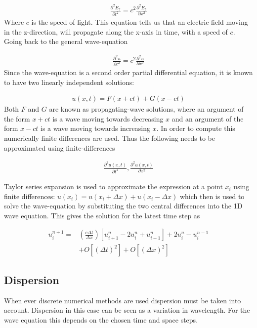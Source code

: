 \begin{align}
  \frac{\partial^2 E_z}{\partial t^2} = c^2 \frac{\partial^2 E_z}{\partial x^2}
\end{align}
Where $c$ is the speed of light. This equation tells us that an electric field moving in the z-direction, will propagate along the x-axis in time, with a speed of $c$. Going back to the general wave-equation\cite{taflove2000computional}

\begin{align}
  \frac{\partial^2 u}{\partial t^2} = c^2 \frac{\partial^2 u}{\partial x^2}
\end{align}
Since the wave-equation is a second order partial differential equation, it is known to have two linearly independent solutions\cite{taflove2000computional}: 

\begin{align}
  u(x,t) = F(x+ct) + G(x-ct)
\end{align}
Both $F$ and $G$ are known as propagating-wave solutions, where an argument of the form $x+ct$ is a wave moving towards decreasing $x$ and an argument of the form $x-ct$ is a wave moving towards increasing $x$\cite{taflove2000computional}. In order to compute this numerically finite differences are used. Thus the following needs to be approximated using finite-differences 

\begin{align}
  \frac{\partial^2 u(x,t)}{\partial t^2},\frac{\partial^2 u(x,t)}{\partial x^2}
\end{align}

Taylor series expansion is used to approximate the expression at a point $x_i$ using finite differences: $u(x_i) = u(x_i+\Delta x) + u(x_i - \Delta x)$ which then is used to solve the wave-equation by substituting the two central differences into the 1D wave equation. This gives the solution for the latest time step as\cite{taflove2000computional}

\begin{align*}
  u_i^{n+1} =& \left( \frac{c\Delta t}{\Delta x} \right) \left[ u_{i+1}^n - 2u_i^n + u_{i-1}^n \right] + 2u_i^n -u_i^{n-1} \\
             &+ O[(\Delta t)^2] + O[(\Delta x)^2]
\end{align*}

\subsection{Dispersion}
When ever discrete numerical methods are used dispersion must be taken into account. Dispersion in this case can be seen as a variation in wavelength. For the wave equation this depends on the chosen time and space steps\cite{taflove2000computional}. 

